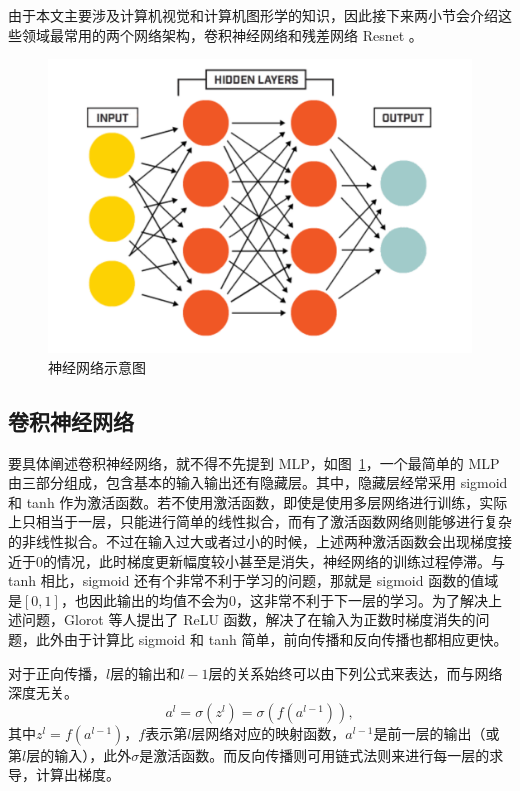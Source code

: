由于本文主要涉及计算机视觉和计算机图形学的知识，因此接下来两小节会介绍这些领域最常用的两个网络架构，卷积神经网络和残差网络 Resnet 。

\begin{figure}[t]
  \centering
  \includegraphics[width=0.9\linewidth]{figures/fc.png}
  \caption{神经网络示意图}
  \label{fig:neuralNetwork}
\end{figure}

\subsection{卷积神经网络}
要具体阐述卷积神经网络，就不得不先提到 MLP，如图~\ref{fig:neuralNetwork}，一个最简单的 MLP 由三部分组成，包含基本的输入输出还有隐藏层。其中，隐藏层经常采用 sigmoid 和 tanh 作为激活函数。若不使用激活函数，即使是使用多层网络进行训练，实际上只相当于一层，只能进行简单的线性拟合，而有了激活函数网络则能够进行复杂的非线性拟合。不过在输入过大或者过小的时候，上述两种激活函数会出现梯度接近于0的情况，此时梯度更新幅度较小甚至是消失，神经网络的训练过程停滞。与 tanh 相比，sigmoid 还有个非常不利于学习的问题，那就是 sigmoid 函数的值域是$[0,1]$，也因此输出的均值不会为0，这非常不利于下一层的学习。为了解决上述问题，Glorot 等人\cite{glorot2011deep}提出了 ReLU 函数，解决了在输入为正数时梯度消失的问题，此外由于计算比 sigmoid 和 tanh 简单，前向传播和反向传播也都相应更快。

对于正向传播，$l$层的输出和$l-1$层的关系始终可以由下列公式来表达，而与网络深度无关。
\begin{equation}
    a^{l} = \sigma(z^{l}) = \sigma(f(a^{l-1})),
\end{equation}
其中$z^l = f(a^{l-1})$，$f$表示第$l$层网络对应的映射函数，$a^{l-1}$是前一层的输出（或第$l$层的输入），此外$\sigma$是激活函数。而反向传播则可用链式法则来进行每一层的求导，计算出梯度。

